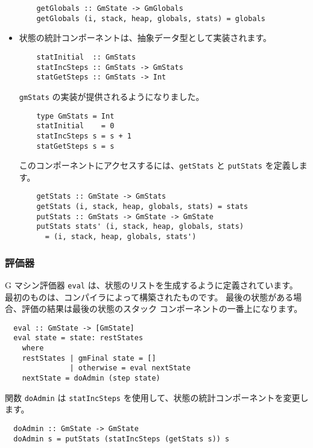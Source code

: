 \documentclass{jarticle}
\begin{document}
\begin{itemize}
	      \begin{verbatim}
    getGlobals :: GmState -> GmGlobals
    getGlobals (i, stack, heap, globals, stats) = globals
  \end{verbatim}

	\item 状態の統計コンポーネントは、抽象データ型として実装されます。

	      \begin{verbatim}
    statInitial  :: GmStats
    statIncSteps :: GmStats -> GmStats
    statGetSteps :: GmStats -> Int
  \end{verbatim}

	      \texttt{gmStats} の実装が提供されるようになりました。

	      \begin{verbatim}
    type GmStats = Int
    statInitial    = 0
    statIncSteps s = s + 1
    statGetSteps s = s
  \end{verbatim}

	      このコンポーネントにアクセスするには、\texttt{getStats} と \texttt{putStats} を定義します。

	      \begin{verbatim}
    getStats :: GmState -> GmStats
    getStats (i, stack, heap, globals, stats) = stats
    putStats :: GmStats -> GmState -> GmState
    putStats stats' (i, stack, heap, globals, stats)
      = (i, stack, heap, globals, stats')
  \end{verbatim}
\end{itemize}

\subsubsection{評価器}

G マシン評価器 \texttt{eval} は、状態のリストを生成するように定義されています。
最初のものは、コンパイラによって構築されたものです。
最後の状態がある場合、評価の結果は最後の状態のスタック コンポーネントの一番上になります。

\begin{verbatim}
  eval :: GmState -> [GmState]
  eval state = state: restStates
    where
    restStates | gmFinal state = []
               | otherwise = eval nextState
    nextState = doAdmin (step state)
\end{verbatim}

関数 \texttt{doAdmin} は \texttt{statIncSteps} を使用して、状態の統計コンポーネントを変更します。

\begin{verbatim}
  doAdmin :: GmState -> GmState
  doAdmin s = putStats (statIncSteps (getStats s)) s
\end{verbatim}
\end{document}
